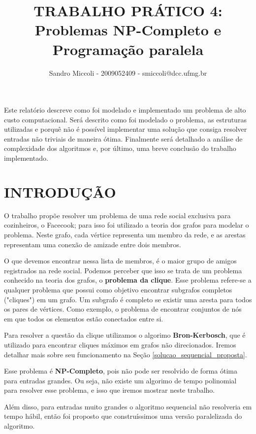 \documentclass[12pt]{article}
\title{TRABALHO PRÁTICO 4: \\ Problemas NP-Completo e Programação paralela}
\author{Sandro Miccoli - 2009052409 - smiccoli@dcc.ufmg.br}
\begin{document}
\maketitle

\begin{resumo}
Este relatório descreve como foi modelado e implementado um problema de alto custo computacional. Será descrito como foi modelado o problema, as estruturas utilizadas e porquê não é possível implementar uma solução que consiga resolver entradas não triviais de maneira ótima. Finalmente será detalhado a análise de complexidade dos algoritmos e, por último, uma breve conclusão do trabalho implementado.
\end{resumo}

\section{INTRODUÇÃO}

    O trabalho propõe resolver um problema de uma rede social exclusiva para cozinheiros, o Facecook; para isso foi utilizado a teoria dos grafos para modelar o problema. Neste grafo, cada vértice representa um membro da rede, e as arestas representam uma conexão de amizade entre dois membros.

    O que devemos encontrar nessa lista de membros, é o maior grupo de amigos registrados na rede social. Podemos perceber que isso se trata de um problema conhecido na teoria dos grafos, o \textbf{problema da clique}. Esse problema refere-se a qualquer problema que possui como objetivo encontrar subgrafos completos ("cliques") em um grafo. Um subgrafo é completo se existir uma aresta para todos os pares de vértices. Como exemplo, o problema de encontrar conjuntos de nós em que todos os elementos estão conectados entre si. \cite{wikiclique}

    Para resolver a questão da clique utilizamos o algorimo \textbf{Bron-Kerbosch}, que é utilizado para encontrar cliques máximos em grafos não direcionados. Iremos detalhar mais sobre seu funcionamento na Seção \ref{solucao_sequencial_proposta}.

    Esse problema é \textbf{NP-Completo}, pois não pode ser resolvido de forma ótima para entradas grandes. Ou seja, não existe um algorimo de tempo polinomial para resolver esse problema, e isso que iremos mostrar neste trabalho.

    Além disso, para entradas muito grandes o algoritmo sequencial não resolveria em tempo hábil, então foi proposto que construíssimos uma versão paralelizada do algoritmo.
\end{document}
